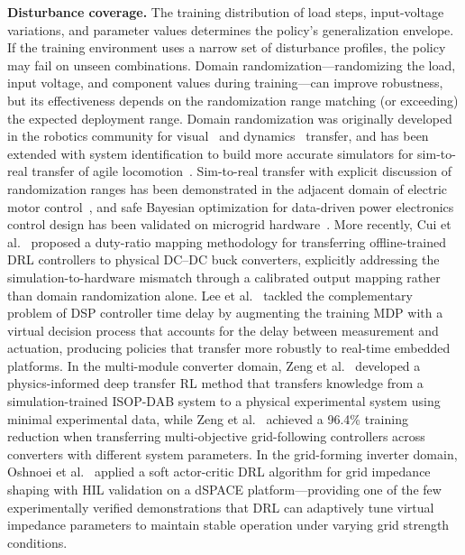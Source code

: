 \documentclass[manuscript,screen,review]{acmart}
\begin{document}
\textbf{Disturbance coverage.}
The training distribution of load steps, input-voltage variations, and parameter values determines the policy's generalization envelope.
If the training environment uses a narrow set of disturbance profiles, the policy may fail on unseen combinations.
Domain randomization---randomizing the load, input voltage, and component values during training---can improve robustness, but its effectiveness depends on the randomization range matching (or exceeding) the expected deployment range.
Domain randomization was originally developed in the robotics community for visual~\cite{tobin2017domain} and dynamics~\cite{peng2018sim} transfer, and has been extended with system identification to build more accurate simulators for sim-to-real transfer of agile locomotion~\cite{tan2018sim}.
Sim-to-real transfer with explicit discussion of randomization ranges has been demonstrated in the adjacent domain of electric motor control~\cite{book2021transferring}, and safe Bayesian optimization for data-driven power electronics control design has been validated on microgrid hardware~\cite{book2021safe}. More recently, Cui et al.~\cite{cui2023implementation} proposed a duty-ratio mapping methodology for transferring offline-trained DRL controllers to physical DC--DC buck converters, explicitly addressing the simulation-to-hardware mismatch through a calibrated output mapping rather than domain randomization alone. Lee et al.~\cite{lee2024reinforcement} tackled the complementary problem of DSP controller time delay by augmenting the training MDP with a virtual decision process that accounts for the delay between measurement and actuation, producing policies that transfer more robustly to real-time embedded platforms.
In the multi-module converter domain, Zeng et al.~\cite{zeng2025physics} developed a physics-informed deep transfer RL method that transfers knowledge from a simulation-trained ISOP-DAB system to a physical experimental system using minimal experimental data, while Zeng et al.~\cite{zeng2025multi} achieved a 96.4\% training reduction when transferring multi-objective grid-following controllers across converters with different system parameters.
In the grid-forming inverter domain, Oshnoei et al.~\cite{oshnoei2024grid} applied a soft actor-critic DRL algorithm for grid impedance shaping with HIL validation on a dSPACE platform---providing one of the few experimentally verified demonstrations that DRL can adaptively tune virtual impedance parameters to maintain stable operation under varying grid strength conditions.
\end{document}
